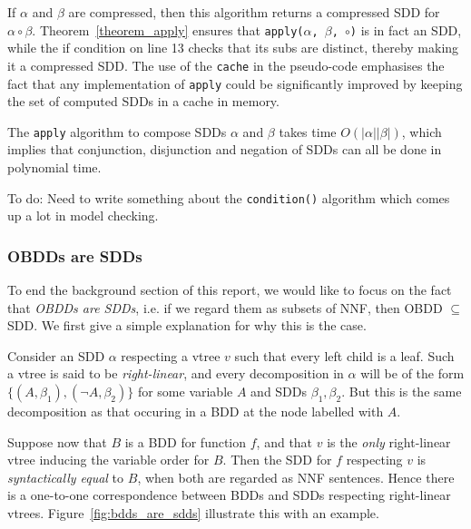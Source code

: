 \documentclass[11pt]{article}
\begin{document}
If $\alpha$ and $\beta$ are compressed, then this algorithm returns a compressed SDD for $\alpha \circ \beta$. 
Theorem~\ref{theorem_apply} ensures that \texttt{apply($\alpha$, $\beta$, $\circ$)} is in fact an SDD, while the if condition on line 13 checks that its subs are distinct, thereby making it a compressed SDD. The use of the \texttt{cache} in the pseudo-code emphasises the fact that any implementation of \texttt{apply} could be significantly improved by keeping the set of computed SDDs in a cache in memory. 

The \texttt{apply} algorithm to compose SDDs $\alpha$ and $\beta$ takes time $O(|\alpha||\beta|)$, which implies that conjunction, disjunction and negation of SDDs can all be done in polynomial time.

To do: Need to write something about the \texttt{condition()} algorithm which comes up a lot in model checking.

\subsubsection{OBDDs are SDDs}
\label{bdds_are_sdds}
To end the background section of this report, we would like to  focus on the fact that \textit{OBDDs are SDDs}, i.e. if we regard them as subsets of NNF, then OBDD $\subseteq$ SDD. We first give a simple explanation for why this is the case. 

Consider an SDD $\alpha$ respecting a vtree $v$ such that every left child is a leaf. Such a vtree is said to be \textit{right-linear}, and every decomposition in $\alpha$ will be of the form $\{(A, \beta_1), (\lnot A, \beta_2)\}$ for some variable $A$ and SDDs $\beta_1, \beta_2$. 
But this is the same decomposition as that occuring in a BDD at the node labelled with $A$.

Suppose now that $B$ is a BDD for function $f$, and that $v$ is the \textit{only} right-linear vtree inducing the variable order for $B$. Then the SDD for $f$ respecting $v$ is \textit{syntactically equal} to $B$, when both are regarded as NNF sentences. Hence there is a one-to-one correspondence between BDDs and SDDs respecting right-linear vtrees. 
Figure~\ref{fig:bdds_are_sdds} illustrate this with an example. 
\end{document}
